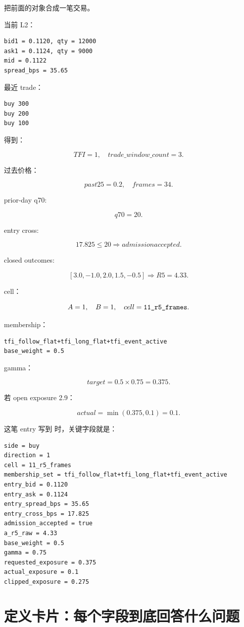 把前面的对象合成一笔交易。

当前 L2：

\begin{lstlisting}
bid1 = 0.1120, qty = 12000
ask1 = 0.1124, qty = 9000
mid = 0.1122
spread_bps = 35.65
\end{lstlisting}

最近 trade：

\begin{lstlisting}
buy 300
buy 200
buy 100
\end{lstlisting}

得到：

\[
TFI=1,\quad trade\_window\_count=3.
\]

过去价格：

\[
past25=0.2,\quad frames=34.
\]

prior-day q70:

\[
q70=20.
\]

entry cross:

\[
17.825 \le 20 \Rightarrow admission accepted.
\]

closed outcomes:

\[
[3.0,-1.0,2.0,1.5,-0.5]\Rightarrow R5=4.33.
\]

cell：

\[
A=1,\quad B=1,\quad cell=\text{\ttfamily 11\_r5\_frames}.
\]

membership：

\begin{lstlisting}
tfi_follow_flat+tfi_long_flat+tfi_event_active
base_weight = 0.5
\end{lstlisting}

gamma：

\[
target=0.5\times0.75=0.375.
\]

若 open exposure 2.9：

\[
actual=\min(0.375,0.1)=0.1.
\]

这笔 entry 写到  时，关键字段就是：

\begin{lstlisting}
side = buy
direction = 1
cell = 11_r5_frames
membership_set = tfi_follow_flat+tfi_long_flat+tfi_event_active
entry_bid = 0.1120
entry_ask = 0.1124
entry_spread_bps = 35.65
entry_cross_bps = 17.825
admission_accepted = true
a_r5_raw = 4.33
base_weight = 0.5
gamma = 0.75
requested_exposure = 0.375
actual_exposure = 0.1
clipped_exposure = 0.275
\end{lstlisting}

\section{定义卡片：每个字段到底回答什么问题}

